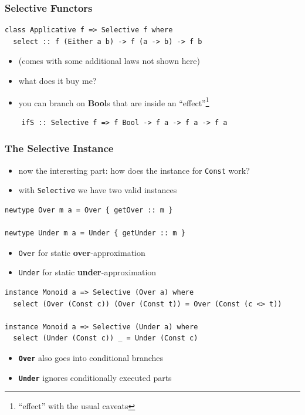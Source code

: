\documentclass[aspectratio=169]{beamer}
\begin{document}
\begin{frame}[fragile]
  \frametitle{Selective Functors}
  \begin{verbatim}
class Applicative f => Selective f where
  select :: f (Either a b) -> f (a -> b) -> f b
  \end{verbatim}
  \vspace{5mm}
  \begin{itemize}
  \item (comes with some additional laws not shown here)
  \item what does it buy me?
  \item you can branch on \textbf{Bool}s that are inside an ``effect''\footnote{``effect'' with the usual caveats}
  \end{itemize}
  \begin{verbatim}
    ifS :: Selective f => f Bool -> f a -> f a -> f a
  \end{verbatim}
\end{frame}

\begin{frame}[fragile,t]
  \frametitle{The Selective Instance}
    \begin{itemize}
  \item now the interesting part: how does the instance for \texttt{Const} work?
  \item with \texttt{Selective} we have two valid instances
  \end{itemize}
  \vfill
  \begin{verbatim}
newtype Over m a = Over { getOver :: m }

newtype Under m a = Under { getUnder :: m }
  \end{verbatim}
  \vfill
  \begin{itemize}
  \item \texttt{Over} for static \textbf{over}-approximation
  \item \texttt{Under} for static \textbf{under}-approximation
  \end{itemize}
\end{frame}

\begin{frame}[fragile]
  \begin{verbatim}
instance Monoid a => Selective (Over a) where
  select (Over (Const c)) (Over (Const t)) = Over (Const (c <> t))

instance Monoid a => Selective (Under a) where
  select (Under (Const c)) _ = Under (Const c)
  \end{verbatim}
  \vfill
  \begin{itemize}
  \item \textbf{\texttt{Over}} also goes into conditional branches
  \item \textbf{\texttt{Under}} ignores conditionally executed parts
  \end{itemize}
\end{frame}
\end{document}
